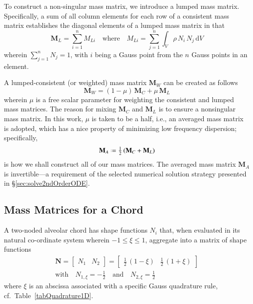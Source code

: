 To construct a non-singular mass matrix, we introduce a lumped mass matrix.  Specifically, a sum of all column elements for each row of a consistent mass matrix establishes the diagonal elements of a lumped mass matrix \cite{Reddy93} in that
\begin{equation}
\mathbf{M}_L = \sum_{i=1}^n M_{Li} 
\quad \text{where} \quad
M_{Li} = \sum_{j=1}^n \int_{V} \rho \, N_i \, N_j \, \mathrm{d} V 
\label{lumpedMassMatrix}
\end{equation}
wherein $\sum_{j=1}^n N_j = 1$, with $i$ being a Gauss point from the $n$ Gauss points in an element.

A lumped-consistent (or weighted) mass matrix $\mathbf{M}_W $ can be created as follows
\begin{equation}
\mathbf{M}_W  = (1 - \mu) \, \mathbf{M}_{C} + \mu \, \mathbf{M}_{L}
\end{equation}
wherein $\mu$ is a free scalar parameter for weighting the consistent and lumped mass matrices.  The reason for mixing $\mathbf{M}_C$ and $\mathbf{M}_L$ is to ensure a nonsingular mass matrix.  In this work, $\mu$ is taken to be a half, i.e., an averaged mass matrix is adopted, which has a nice property of minimizing low frequency dispersion; specifically, 
\begin{equation}
\mathbf{M}_A  \defeq \tfrac{1}{2} \, (\mathbf{M}_{C} + \mathbf{M}_{L})
\label{LumconsMass}
\end{equation}
is how we shall construct all of our mass matrices.  The averaged mass matrix $\mathbf{M}_A$ is invertible---a requirement of the selected numerical solution strategy presented in \S\ref{sec:solve2ndOrderODE}.

\subsection{Mass Matrices for a Chord}

A two-noded alveolar chord has shape functions $N_i$ that, when evaluated in its natural co-ordinate system wherein $-1 \leq \xi \leq 1$, aggregate into a matrix of shape functions
\begin{multline}
\mathbf{N} = \begin{bmatrix} N_1 & N_2 \end{bmatrix} =
\begin{bmatrix}
\frac{1}{2} \, (1 - \xi) &  \frac{1}{2} \, (1 + \xi)
\end{bmatrix} \\
\text{with} \quad
N_{1,\xi} = -\tfrac{1}{2} 
\quad \text{and} \quad
N_{2,\xi} = \tfrac{1}{2}
\end{multline}
where $\xi$ is an abscissa associated with a specific Gauss quadrature rule, cf.\ Table~\ref{tabQuadrature1D}.

